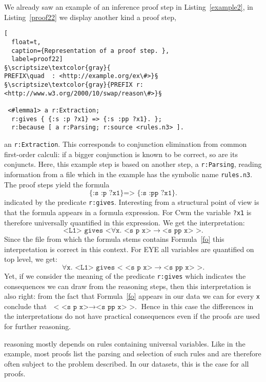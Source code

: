 We already saw an example
of an inference proof
step in Listing~\ref{example2}, in 
Listing~\ref{proof22} we display another kind a proof step,
\begin{lstlisting}[
  float=t,
  caption={Representation of a proof step. },
  label=proof22]
§\scriptsize\textcolor{gray}{
PREFIX\quad  : <http://example.org/ex\#>}§
§\scriptsize\textcolor{gray}{PREFIX r: <http://www.w3.org/2000/10/swap/reason\#>}§

 <#lemma1> a r:Extraction;
  r:gives { {:s :p ?x1} => {:s :pp ?x1}. };
  r:because [ a r:Parsing; r:source <rules.n3> ].
\end{lstlisting}
% 
an \texttt{r:Extraction}. This corresponds to conjunction elimination from common first-order calculi: 
if a bigger conjunction is known 
to be correct, so are its conjuncts. %
Here, this example step 
is based on another step, a \texttt{r:Parsing}, \ie reading information from a file which in the example has the symbolic name \texttt{rules.n3}.
The proof steps yield the formula \begin{equation}\texttt{\{:s :p ?x1\} => \{:s :pp ?x1\}.}\label{fo}\end{equation} indicated by the predicate \texttt{r:gives}. 
Interesting from a structural point of view is  
that the formula appears in a formula expression.  For Cwm the variable \texttt{?x1} is therefore universally quantified in this expression. We get the interpretation:
\[
 \texttt{<L1> gives <}\forall \texttt{x. <s p x>}\rightarrow\texttt{<s pp x> >.}
\]
Since the file from which the formula stems contains Formula~\ref{fo} this interpretation is correct in this context. For 
EYE all variables are quantified on top level,  we get: %
\[
\forall \texttt{x. <L1> gives < <s p x>}\rightarrow\texttt{<s pp x> >.}
\]
Yet, if we consider the meaning of the predicate \texttt{r:gives} which indicates the consequences we can draw from the reasoning steps, then this interpretation is also right:
from the fact that Formula~\ref{fo} appears in our data we can for every \texttt{x} conclude that $\texttt{ < <s p x>}\rightarrow\texttt{<s pp x> >.}$ 
Hence in this case the differences 
in the interpretations do not have practical consequences even if the proofs are used for further reasoning.

\nthree reasoning mostly depends on rules containing universal variables. Like in the example, most proofs list the parsing and selection of such rules and 
are therefore often
subject to the problem described. In our datasets, this is the case for all proofs. 

